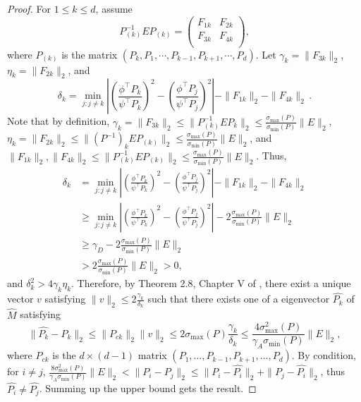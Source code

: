 \ICAeigenvectorvariation*
\begin{proof}
	For $1\le k\le d$, assume 
	\[
	P_{(k)}^{-1} E P_{(k)} =  
	\left(
	\begin{array}{cc}
	F_{1k} & F_{2k}\\
	F_{3k} & F_{4k} \\
	\end{array} 
	\right), 
	\]
	where $P_{(k)}$ is the matrix $(P_k, P_1, \cdots, P_{k-1}, P_{k+1}, \cdots, P_d)$.
	Let $\gamma_k = \|F_{3k}\|_2$, $\eta_k = \|F_{2k}\|_2$, and 
	\[
	\delta_k = \min_{j: j\neq k} 
	\left\vert \left(\frac{\phi^{\top}P_k}{\psi^{\top}P_k}\right)^2 -\left( \frac{\phi^{\top}P_j}{\psi^{\top}P_j}\right)^2 \right\vert - \|F_{1k}\|_2 - \|F_{4k}\|_2\,.
	\]
	Note that by definition, $\gamma_k = \|F_{3k}\|_2\le\|P_{(k)}^{-1}EP_{k}\|_2\le\frac{\sigma_{\max}(P)}{\sigma_{\min}(P)}\|E\|_2$,
	$\eta_k = \|F_{2k}\|_2\le\|(P^{-1})_kEP_{(k)}\|_2\le\frac{\sigma_{\max}(P)}{\sigma_{\min}(P)}\|E\|_2$, 
	and $\|F_{1k}\|_2,\|F_{4k}\|_2\le\|P_{(k)}^{-1} E P_{(k)}\|_2\le\frac{\sigma_{\max}(P)}{\sigma_{\min}(P)}\|E\|_2$. 
	Thus,
	\begin{align*}
	\delta_k & = \min_{j:j\neq k} 
	\left\vert \left(\frac{\phi^{\top}P_k}{\psi^{\top}P_k}\right)^2 - \left(\frac{\phi^{\top}P_j}{\psi^{\top}P_j}\right)^2 \right\vert - \|F_{1k}\|_2 - \|F_{4k}\|_2\\
	& \ge \min_{j:j\neq k} \left\vert \left(\frac{\phi^{\top}P_k}{\psi^{\top}P_k}\right)^2 - \left(\frac{\phi^{\top}P_j}{\psi^{\top}P_j}\right)^2 \right\vert - 2 \frac{\sigma_{\max}(P)}{\sigma_{\min}(P)}\|E\|_2\\
	& \ge  \gamma_D -  2 \frac{\sigma_{\max}(P)}{\sigma_{\min}(P)}\|E\|_2 \\
	& >  2 \frac{\sigma_{\max}(P)}{\sigma_{\min}(P)}\|E\|_2 >0,
	\end{align*}
	and $\delta_k^2 > 4\gamma_k\eta_k$. 
	Therefore, by Theorem 2.8, Chapter V of \citep{stewart1990matrix}, there exist a unique vector $v$ satisfying $\|v\|_2\le 2\frac{\gamma_k}{\delta_k}$ such that there exists one of a eigenvector $\hat{P_k}$ of $\hat{M}$ satisfying
	\[
	\|\hat{P_k} - P_k\|_2 \le \|P_{ck}\|_2 \|v\|_2 \le 2\sigma_{\max}(P)\frac{\gamma_k}{\delta_k}
	\le 
	\frac{4\sigma_{\max}^2(P)}{\gamma_A \sigma_{\min}(P)} \|E\|_2,
	\]
	where $P_{ck}$ is the $d\times (d-1)$ matrix $(P_1,\ldots,P_{k-1}, P_{k+1},\ldots,P_d)$.
	By condition, for $i\neq j$,  $\frac{8\sigma_{\max}^2(P)}{\gamma_A \sigma_{\min}(P)} \|E\|_2 < \|P_i - P_j\|_2\le \|P_i - \hat{P_i}\|_2 + \|P_j - \hat{P_i}\|_2$, thus $\hat{P_i} \neq \hat{P_j}$.  Summing up the upper bound gets the result. 
\end{proof}
